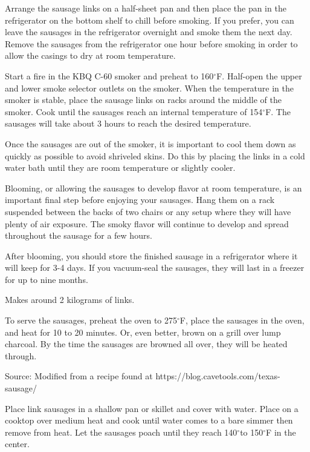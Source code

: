 \documentclass[letterpaper]{recipePMG}
\renewcommand{\deg}{$^\circ$}
\begin{document}
Arrange the sausage links on a half-sheet pan and then place the pan in the refrigerator on the bottom shelf to chill before smoking. If you prefer, you can leave the sausages in the refrigerator overnight and smoke them the next day. Remove the sausages from the refrigerator one hour before smoking in order to allow the casings to dry at room temperature.

Start a fire in the KBQ C-60 smoker and preheat to 160\deg F. Half-open the upper and lower smoke selector outlets on the smoker.  When the temperature in the smoker is stable, place the sausage links on racks around the middle of the smoker. Cook until the sausages reach an internal temperature of 154\deg F.  The sausages will take about 3 hours to reach the desired temperature.
   
Once the sausages are out of the smoker, it is important to cool them down as quickly as possible to avoid shriveled skins. Do this by placing the links in a cold water bath until they are room temperature or slightly cooler.


Blooming, or allowing the sausages to develop flavor at room temperature, is an important final step before enjoying your sausages. Hang them on a rack suspended between the backs of two chairs or any setup where they will have plenty of air exposure. The smoky flavor will continue to develop and spread throughout the sausage for a few hours. 

After blooming, you should store the finished sausage in a refrigerator where it will keep for 3-4 days. If you vacuum-seal the sausages, they will last in a freezer for up to nine months.

Makes around 2 kilograms of links.

To serve the sausages, preheat the oven to 275\deg F, place the sausages in the oven, and heat for 10 to 20 minutes. Or, even better, brown on a grill over lump charcoal. By the time the sausages are browned all over, they will be heated through.

Source: Modified from a recipe found at https://blog.cavetools.com/texas-sausage/


\newpage
{}
 
 
 Place link sausages in a shallow pan or skillet and cover with water.  Place on a cooktop over medium heat and cook until water comes to a bare simmer then remove from heat.  Let the sausages poach until they reach 140\deg to 150\deg F in the center. 
 
\end{document}
